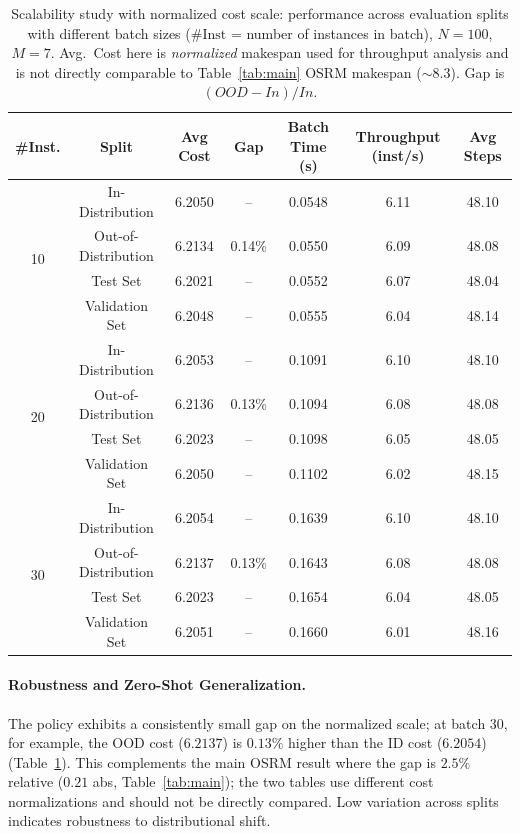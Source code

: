 \documentclass[journal,twoside,web]{ieeecolor}
\theoremstyle{definition}
\theoremstyle{remark}
\theoremstyle{definition}
\begin{document}
\begin{table}[htbp]
\centering
\caption{Scalability study with normalized cost scale: performance across evaluation splits with different batch sizes ($\#\text{Inst}$ = number of instances in batch), $N{=}100$, $M{=}7$. Avg.\ Cost here is \emph{normalized} makespan used for throughput analysis and is not directly comparable to Table~\ref{tab:main} OSRM makespan ($\sim 8.3$). Gap is $(OOD-In)/In$.}
\label{tab:instance_scaling}
\begin{tabular}{ccccccc}
\toprule
\textbf{\#Inst.} & \textbf{Split} & \textbf{Avg Cost} & \textbf{Gap} & \textbf{Batch Time (s)} & \textbf{Throughput (inst/s)} & \textbf{Avg Steps} \\
\midrule
\multirow{4}{*}{10}
& In-Distribution     & 6.2050 & -- & 0.0548 & 6.11  & 48.10 \\
& Out-of-Distribution & 6.2134 & 0.14\% & 0.0550 & 6.09  & 48.08 \\
& Test Set            & 6.2021 & -- & 0.0552 & 6.07  & 48.04 \\
& Validation Set      & 6.2048 & -- & 0.0555 & 6.04  & 48.14 \\
\midrule
\multirow{4}{*}{20}
& In-Distribution     & 6.2053 & -- & 0.1091 & 6.10  & 48.10 \\
& Out-of-Distribution & 6.2136 & 0.13\% & 0.1094 & 6.08  & 48.08 \\
& Test Set            & 6.2023 & -- & 0.1098 & 6.05  & 48.05 \\
& Validation Set      & 6.2050 & -- & 0.1102 & 6.02  & 48.15 \\
\midrule
\multirow{4}{*}{30}
& In-Distribution     & 6.2054 & -- & 0.1639 & 6.10  & 48.10 \\
& Out-of-Distribution & 6.2137 & 0.13\% & 0.1643 & 6.08  & 48.08 \\
& Test Set            & 6.2023 & -- & 0.1654 & 6.04  & 48.05 \\
& Validation Set      & 6.2051 & -- & 0.1660 & 6.01  & 48.16 \\
\bottomrule
\end{tabular}
\end{table}

\paragraph{Robustness and Zero-Shot Generalization.}
The policy exhibits a consistently small gap on the normalized scale; at batch $30$, for example, the OOD cost ($6.2137$) is $0.13\%$ higher than the ID cost ($6.2054$) (Table~\ref{tab:instance_scaling}). This complements the main OSRM result where the gap is $2.5\%$ relative ($0.21$ abs, Table~\ref{tab:main}); the two tables use different cost normalizations and should not be directly compared. Low variation across splits indicates robustness to distributional shift.
\end{document}
